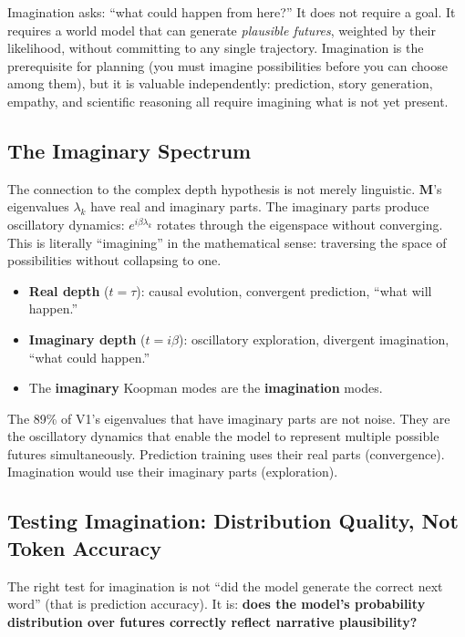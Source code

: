 \documentclass[11pt, a4paper]{article}
\newcommand{\M}{\mathbf{M}}
\theoremstyle{plain}
\theoremstyle{definition}
\theoremstyle{remark}
\begin{document}
Imagination asks: ``what could happen from here?''
It does not require a goal.
It requires a world model that can generate \emph{plausible futures}, weighted by their likelihood, without committing to any single trajectory.
Imagination is the prerequisite for planning (you must imagine possibilities before you can choose among them), but it is valuable independently: prediction, story generation, empathy, and scientific reasoning all require imagining what is not yet present.

\subsection{The Imaginary Spectrum}

The connection to the complex depth hypothesis is not merely linguistic.
$\M$'s eigenvalues $\lambda_k$ have real and imaginary parts.
The imaginary parts produce oscillatory dynamics: $e^{i\beta\lambda_k}$ rotates through the eigenspace without converging.
This is literally ``imagining'' in the mathematical sense: traversing the space of possibilities without collapsing to one.

\begin{itemize}[nosep]
    \item \textbf{Real depth} ($t = \tau$): causal evolution, convergent prediction, ``what will happen.''
    \item \textbf{Imaginary depth} ($t = i\beta$): oscillatory exploration, divergent imagination, ``what could happen.''
    \item The \textbf{imaginary} Koopman modes are the \textbf{imagination} modes.
\end{itemize}

The 89\% of V1's eigenvalues that have imaginary parts are not noise.
They are the oscillatory dynamics that enable the model to represent multiple possible futures simultaneously.
Prediction training uses their real parts (convergence).
Imagination would use their imaginary parts (exploration).

\subsection{Testing Imagination: Distribution Quality, Not Token Accuracy}

The right test for imagination is not ``did the model generate the correct next word'' (that is prediction accuracy).
It is: \textbf{does the model's probability distribution over futures correctly reflect narrative plausibility?}
\end{document}
